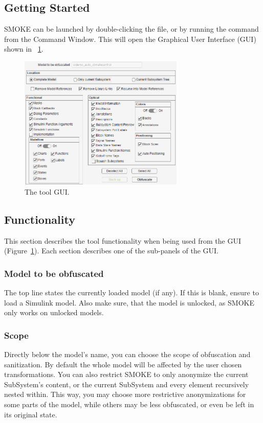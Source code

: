 \documentclass{article}
\makeatletter
\newcommand{\toolname}{SMOKE\@\xspace}
\makeatother
\begin{document}
\subsection{Getting Started}
\toolname can be launched by double-clicking the  file, or by running the command  from the Command Window. This will open the Graphical User Interface (GUI) shown in \figurename~\ref{fig:contextMenu}.

\begin{figure}[htb!]
	\centering
	\includegraphics[width=0.7\textwidth]{../figs/GUI}
	\caption{The tool GUI.}
	\label{fig:contextMenu}
\end{figure}

\newpage
\subsection{Functionality}
This section describes the tool functionality when being used from the GUI (Figure~\ref{fig:contextMenu}). Each section describes one of the sub-panels of the GUI.

\subsubsection{Model to be obfuscated}
The top line states the currently loaded model (if any). If this is blank, ensure to load a Simulink model. Also make sure, that the model is unlocked, as \toolname only works on unlocked models.

\subsubsection{Scope}
Directly below the model's name, you can choose the scope of obfuscation and sanitization. By default the whole model will be affected by the user chosen transformations. You can also restrict \toolname to only anonymize the current SubSystem's content, or the current SubSystem and every element recursively nested within. This way, you may choose more restrictive anonymizations for some parts of the model, while others may be less obfuscated, or even be left in its original state.
\end{document}

